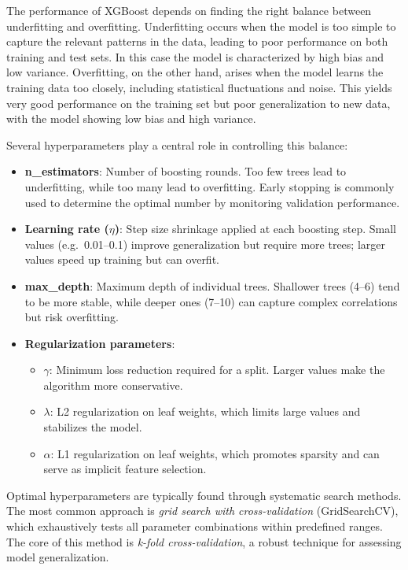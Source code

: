The performance of XGBoost depends on finding the right balance between underfitting and overfitting. Underfitting occurs when the model is too simple to capture the relevant patterns in the data, leading to poor performance on both training and test sets. In this case the model is characterized by high bias and low variance. Overfitting, on the other hand, arises when the model learns the training data too closely, including statistical fluctuations and noise. This yields very good performance on the training set but poor generalization to new data, with the model showing low bias and high variance.

Several hyperparameters play a central role in controlling this balance:

\begin{itemize}
    \item \textbf{n\_estimators}: Number of boosting rounds. Too few trees lead to underfitting, while too many lead to overfitting. Early stopping is commonly used to determine the optimal number by monitoring validation performance.
    
    \item \textbf{Learning rate ($\eta$)}: Step size shrinkage applied at each boosting step. Small values (e.g.\ 0.01–0.1) improve generalization but require more trees; larger values speed up training but can overfit.
    
    \item \textbf{max\_depth}: Maximum depth of individual trees. Shallower trees (4–6) tend to be more stable, while deeper ones (7–10) can capture complex correlations but risk overfitting.
    
    \item \textbf{Regularization parameters}:
    \begin{itemize}
        \item $\gamma$: Minimum loss reduction required for a split. Larger values make the algorithm more conservative.
        \item $\lambda$: L2 regularization on leaf weights, which limits large values and stabilizes the model.
        \item $\alpha$: L1 regularization on leaf weights, which promotes sparsity and can serve as implicit feature selection.
    \end{itemize}
\end{itemize}
Optimal hyperparameters are typically found through systematic search methods. The most common approach is \textit{grid search with cross-validation} (GridSearchCV), which exhaustively tests all parameter combinations within predefined ranges. The core of this method is \textit{k-fold cross-validation}, a robust technique for assessing model generalization. 

